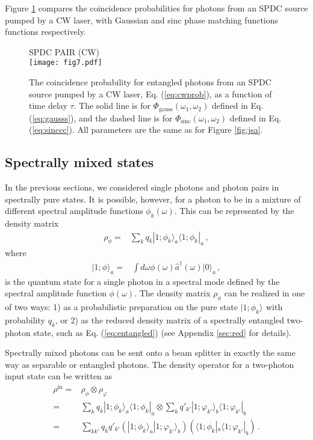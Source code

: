 \documentclass[12pt]{article}
\newcommand{\ket}[2] {| #1 \rangle_{#2}}
\newcommand{\bra}[2] {\langle #1 |_{#2}}
\newcommand{\dg}{^{\dagger}}
\begin{document}
Figure \ref{fig:entcw} compares the coincidence probabilities for photons from an SPDC source pumped by a CW laser, with Gaussian and sinc phase matching functions functions respectively. 

\begin{figure}[h]
\begin{center}
SPDC PAIR (CW)\\
\texttt{[image: fig7.pdf]}
\caption{The coincidence probability for entangled photons from an SPDC source pumped by a CW laser, Eq. (\ref{eq:cwprob}), as a function of time delay $\tau$. The solid line is for  $\Phi_{\mathrm{gauss}}(\omega_1,\omega_2)$ defined in Eq.  (\ref{eq:gausss}), and the dashed line is  for $\Phi_{\mathrm{sinc}}(\omega_1,\omega_2)$ defined in Eq.  (\ref{eq:sinccc}). All parameters are the same as for Figure \ref{fig:jsa}.}
\label{fig:entcw}
\end{center}
\end{figure}


\subsection{Spectrally mixed states}

In the previous sections, we considered single photons and photon pairs in spectrally pure states. It is possible, however, for a photon to be in a mixture of different spectral amplitude functions  $\phi_k(\omega)$. This can be represented by the density matrix 
\begin{align}
\rho_{\phi}={}&\sum_{k}q_{k}\ket{1;\phi_{k}}{a}\bra{1;\phi_{k}}{a}\,,
\end{align} 
where 
\begin{align}
\ket{1;\phi}{a}={}&\int d\omega \phi(\omega)\hat{a}\dg(\omega)\ket{0}{a}\,,
\end{align}
is the quantum state for a single photon in a spectral mode defined by the spectral amplitude function $\phi(\omega)$. The density matrix $\rho_{\phi}$ can be realized in one of two ways: 1) as a probabilistic preparation on the pure state $\ket{1;\phi_{k}}{}$ with probability $q_{k}$, or 2) as the reduced density matrix of a spectrally entangled two-photon state, such as Eq. (\ref{eq:entangled}) (see Appendix \ref{sec:red} for details). 

Spectrally mixed photons can be sent onto a beam splitter in exactly the same way as separable or entangled photons. The density operator for a two-photon input state can be written as 
\begin{align}
\rho^{\mathrm{in}}={}&\rho_{\phi}\otimes\rho_{\varphi}\\
={}&\sum_{k}q_{k}\ket{1;\phi_{k}}{a}\bra{1;\phi_{k}}{a}\otimes \sum_{k}q'_{k'}\ket{1;\varphi_{k'}}{b}\bra{1;\varphi_{k'}}{b}\\
={}&\sum_{kk'}q_{k}q'_{k'}\left(\ket{1;\phi_{k}}{a}\ket{1;\varphi_{k'}}{b}\right)\left(\bra{1;\phi_{k}}{a}\bra{1;\varphi_{k'}}{b}\right)\,.
\end{align}
\end{document}
